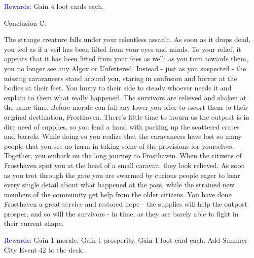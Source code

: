 \documentclass[fontsize=11pt]{scrartcl}
\begin{document}
\begin{multicols*}{3}
		\begin{center}
		  {\myfont\normalsize{\textcolor{Blue}{Rewards:}}}\newline
			\footnotesize{Gain 4 loot cards each.}
		\end{center}
		\vfill\null\columnbreak
		\begin{center}
		  {\myfont\large{\textcolor{OliveGreen}{Conclusion C:}}}
		\end{center}
		\footnotesize{The strange creature falls under your relentless assault. As soon as it drops dead, you feel as if a veil has been lifted from your eyes and minds. To your relief, it appears that it has been lifted from your foes as well: as you turn towards them, you no longer see any Algox or Unfettered. Instead - just as you suspected - the missing caravaneers stand around you, staring in confusion and horror at the bodies at their feet. You hurry to their side to steady whoever needs it and explain to them what really happened. The survivors are relieved and shaken at the same time. Before morale can fall any lower you offer to escort them to their original destination, Frosthaven. There’s little time to mourn as the outpost is in dire need of supplies, so you lend a hand with packing up the scattered crates and barrels. While doing so you realize that the caravaneers have lost so many people that you see no harm in taking some of the provisions for yourselves. Together, you embark on the long journey to Frosthaven.\newline\newline
When the citizens of Frosthaven spot you at the head of a small caravan, they look relieved. As soon as you trot through the gate you are swarmed by curious people eager to hear every single detail about what happened at the pass, while the strained new members of the community get help from the older citizens. You have done Frosthaven a great service and restored hope - the supplies will help the outpost prosper, and so will the survivors - in time, as they are barely able to fight in their current shape.}
		\begin{center}
		  {\myfont\normalsize{\textcolor{Blue}{Rewards:}}}\newline
			\footnotesize{Gain 1 morale.\newline
Gain 1 prosperity.\newline
Gain 1 loot card each.\newline
Add Summer City Event 42 to the deck.}
		\end{center}
		\begin{center}

\end{center}
\end{multicols*}
\end{document}
